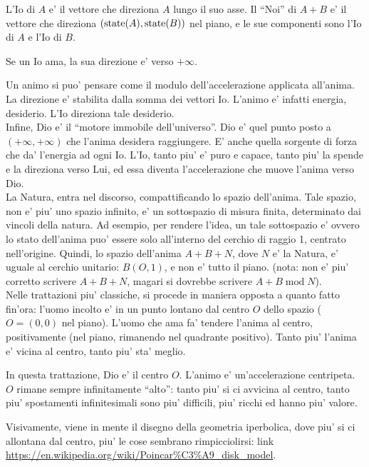 L'Io di $A$ e' il vettore che direziona $A$ lungo il suo asse. Il ``Noi'' di $A+B$ e' il vettore che direziona $(\textrm{state}(A),\textrm{state}(B))$ nel piano, e le sue componenti sono l'Io di $A$ e l'Io di $B$.

Se un Io ama, la sua direzione e' verso $+\infty$.

Un animo si puo' pensare come il modulo dell'accelerazione applicata all'anima. La direzione e' stabilita dalla somma dei vettori Io. L'animo e' infatti energia, desiderio. L'Io direziona tale desiderio.\\

Infine, Dio e' il ``motore immobile dell'universo''. Dio e' quel punto posto a $(+\infty, +\infty)$ che l'anima desidera raggiungere. E' anche quella sorgente di forza che da' l'energia ad ogni Io. L'Io, tanto piu' e' puro e capace, tanto piu' la spende e la direziona verso Lui, ed essa diventa l'accelerazione che muove l'anima verso Dio.\\

La Natura, entra nel discorso, compattificando lo spazio dell'anima. Tale spazio, non e' piu' uno spazio infinito, e' un sottospazio di misura finita, determinato dai vincoli della natura. Ad esempio, per rendere l'idea, un tale sottospazio e' 
ovvero lo stato dell'anima puo' essere solo all'interno del cerchio di raggio 1, centrato nell'origine. Quindi, lo spazio dell'anima $A+B+N$, dove $N$ e' la Natura, e' uguale al cerchio unitario: $B(O,1)$, e non e' tutto il piano. (nota: non e' piu' corretto scrivere $A+B+N$, magari si dovrebbe scrivere $A+B\;\textrm{mod}\;N$).\\

Nelle trattazioni piu' classiche, si procede in maniera opposta a quanto fatto fin'ora: l'uomo incolto e' in un punto lontano dal centro $O$ dello spazio ($O=(0,0)$ nel piano). L'uomo che ama fa' tendere l'anima al centro, positivamente (nel piano, rimanendo nel quadrante positivo). Tanto piu' l'anima e' vicina al centro, tanto piu' sta' meglio.

In questa trattazione, Dio e' il centro $O$. L'animo e' un'accelerazione centripeta. $O$ rimane sempre infinitamente ``alto'': tanto piu' si ci avvicina al centro, tanto piu' spostamenti infinitesimali sono piu' difficili, piu' ricchi ed hanno piu' valore.

Visivamente, viene in mente il disegno della geometria iperbolica, dove piu' si ci allontana dal centro, piu' le cose sembrano rimpicciolirsi: link  \url{https://en.wikipedia.org/wiki/Poincar\%C3\%A9\_disk\_model}.\\


